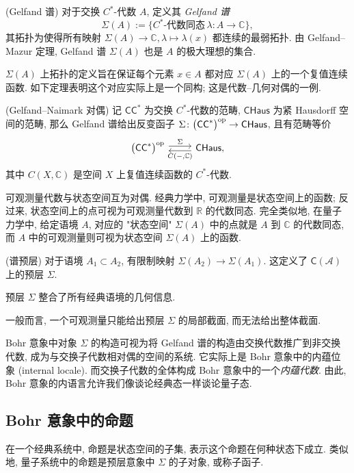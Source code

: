 \begin{definition}
    {(Gelfand 谱)}
    对于交换 $C^*$-代数 $A$, 定义其 \emph{Gelfand 谱}
$$
\Sigma(A) := \{C^*\text{-代数同态}\,\lambda\colon A \to\mathbb{C}\},
$$
其拓扑为使得所有映射 $\Sigma(A)\to\mathbb{C}, \lambda \mapsto \lambda (x)$ 都连续的最弱拓扑. 由 Gelfand--Mazur 定理, Gelfand 谱 $\Sigma(A)$ 也是 $A$ 的极大理想的集合.
\end{definition}

$\Sigma(A)$ 上拓扑的定义旨在保证每个元素 $x\in A$ 都对应 $\Sigma(A)$ 上的一个复值连续函数. 如下定理表明这个对应实际上是一个同构; 这是代数--几何对偶的一例.

\begin{prop}
    {(Gelfand--Naimark 对偶)}
    记 $\mathsf {CC}^*$ 为交换 $C^*$-代数的范畴, $\mathsf{CHaus}$ 为紧 Hausdorff 空间的范畴,
    那么 Gelfand 谱给出反变函子 $\Sigma\colon \big(\mathsf {CC}^*\big)^{\text{op}} \to \mathsf {CHaus}$, 且有范畴等价
    \[\begin{tikzcd}[ampersand replacement=\&]
    	{\big(\mathsf {CC}^*\big)^{\op}} \& {\mathsf {CHaus},}
    	\arrow["\Sigma", shift left, from=1-1, to=1-2]
    	\arrow["{C({-},\mathbb{C})}", shift left, from=1-2, to=1-1]
    \end{tikzcd}\]
    其中 $C(X,\mathbb{C})$ 是空间 $X$ 上复值连续函数的 $C^*$-代数.
\end{prop}

可观测量代数与状态空间互为对偶. 经典力学中, 可观测量是状态空间上的函数; 反过来, 状态空间上的点可视为可观测量代数到 $\mathbb{R}$ 的代数同态.
完全类似地, 在量子力学中, 给定语境 $A$, 对应的 "状态空间" $\Sigma(A)$ 中的点就是 $A$ 到 $\mathbb{C}$ 的代数同态, 而 $A$ 中的可观测量则可视为状态空间 $\Sigma(A)$ 上的函数.

\begin{definition}
    {(谱预层)}
    对于语境 $A_1 \subset A_2$, 有限制映射 $\Sigma(A_2)\to\Sigma(A_1)$. 这定义了 $\mathsf C(\mathcal A)$ 上的预层 $\Sigma$.
\end{definition}

\begin{remark}
    {}
    预层 $\Sigma$ 整合了所有经典语境的几何信息.
    
    一般而言, 一个可观测量只能给出预层 $\Sigma$ 的局部截面, 而无法给出整体截面.
\end{remark}

Bohr 意象中对象 $\Sigma$ 的构造可视为将 Gelfand 谱的构造由交换代数推广到非交换代数, 成为与交换子代数相对偶的空间的系统. 它实际上是 Bohr 意象中的内蕴位象 (internal locale). 而交换子代数的全体构成 Bohr 意象中的一个\emph{内蕴代数}. 由此, Bohr 意象的内语言允许我们像谈论经典态一样谈论量子态.

\subsection{Bohr 意象中的命题}



在一个经典系统中, 命题是状态空间的子集, 表示这个命题在何种状态下成立.
类似地, 量子系统中的命题是预层意象中 $\Sigma$ 的子对象, 或称子函子.